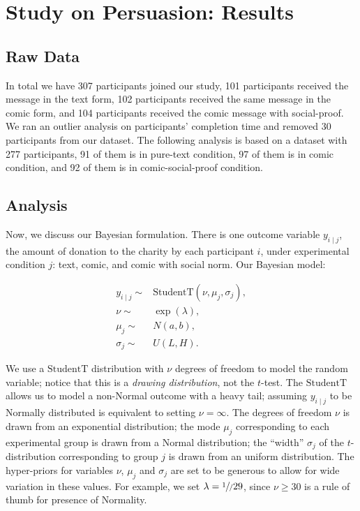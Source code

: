 \section{Study on Persuasion: Results}
\label{sec:Study on Behavior Results}

\subsection{Raw Data}
\label{sub:Study on Behavior Raw Data}
In total we have 307 participants joined our study, 101 participants received the message in the text form, 102 participants received the same message in the comic form, and 104 participants received the comic message with social-proof. We ran an outlier analysis on participants' completion time and removed 30 participants from our dataset. The following analysis is based on a dataset with 277 participants, 91 of them is in pure-text condition, 97 of them is in comic condition, and 92 of them is in comic-social-proof condition.



\subsection{Analysis}
\label{sub:Study on Behavior Analysis}

Now, we discuss our Bayesian formulation. There is one outcome variable $y_{i \mid j}$, the amount of donation to the charity by each participant $i$, under experimental condition $j$: text, comic, and comic with social norm. Our Bayesian model:

\begin{align}
    y_{i \mid j} \sim &  \mathrm{StudentT}(\nu, \mu_j, \sigma_j), \\
    \nu \sim & \exp(\lambda), \\
    \mu_j \sim & N(a,b), \\
    \sigma_j \sim & U(L,H).
\end{align}

We use a $\mathrm{StudentT}$ distribution with $\nu$ degrees of freedom to model the random variable; notice that this is a \textit{drawing distribution}, not the $t$-test. The $\mathrm{StudentT}$ allows us to model a non-Normal outcome with a heavy tail; assuming $y_{i \mid j}$ to be Normally distributed is equivalent to setting $\nu=\infty$. The degrees of freedom $\nu$ is drawn from an exponential distribution; the mode $\mu_j$ corresponding to each experimental group is drawn from a Normal distribution; the ``width'' $\sigma_j$ of the $t$-distribution corresponding to group $j$ is drawn from an uniform distribution. The hyper-priors for variables $\nu$, $\mu_j$ and $\sigma_j$ are set to be generous to allow for wide variation in these values. For example, we set $\lambda=\sfrac{1}/{29}$, since $\nu \geq 30$ is a rule of thumb for presence of Normality.

